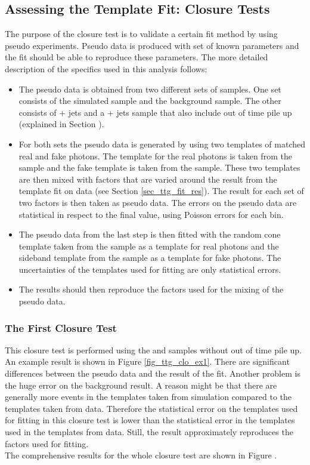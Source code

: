 \subsection{Assessing the Template Fit: Closure Tests}
\label{sec_ttg_clo}

The purpose of the closure test is to validate a certain fit method by using pseudo experiments. Pseudo data is produced with set of known parameters and the fit should be able to reproduce these parameters. The more detailed description of the specifics used in this analysis follows:

\begin{itemize}
\item The pseudo data is obtained from two different sets of samples. One set consists of the simulated \ttgamma sample and the \ttbar background sample. The other consists of \ttgamma + jets and a \ttbar + jets sample that also include out of time pile up (explained in Section ).
\item For both sets the pseudo data is generated by using two templates of matched real and fake photons. The template for the real photons is taken from the \ttgamma sample and the fake template is taken from the \ttbar sample. These two templates are then mixed with factors that are varied around the result from the template fit on data (see Section \ref{sec_ttg_fit_res}). The result for each set of two factors is then taken as pseudo data. The errors on the pseudo data are statistical in respect to the final value, using Poisson errors for each bin.
\item The pseudo data from the last step is then fitted with the random cone template taken from the \ttgamma sample as a template for real photons and the sideband template from the \ttbar sample as a template for fake photons. The uncertainties of the templates used for fitting are only statistical errors.
\item The results should then reproduce the factors used for the mixing of the pseudo data. 
\end{itemize}

\subsubsection{The First Closure Test}

This closure test is performed using the \ttgamma and \ttbar samples without out of time pile up. An example result is shown in Figure \ref{fig_ttg_clo_ex1}. There are significant differences between the pseudo data and the result of the fit. Another problem is the huge error on the background result. A reason might be that there are generally more events in the templates taken from simulation compared to the templates taken from data. Therefore the statistical error on the templates used for fitting in this closure test is lower than the statistical error in the templates used in the templates from data. Still, the result approximately reproduces the factors used for fitting.\\
The comprehensive results for the whole closure test are shown in Figure .\\

